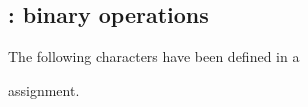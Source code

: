 \def\prevclass{}\def\prevfaml{}

\subsection{ : binary operations}

The following characters have been defined
in a
\begin{disp}
\end{disp}
assignment.
\par\leavevmode\par

